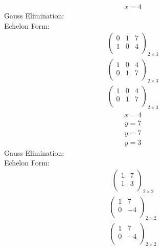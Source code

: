 \documentclass{article}
\begin{document}
\begin{align*}
x=4\end{align*}
Gauss Elimination:\\
Echelon Form:\\
\begin{align*}
\left(
\begin{array}{cc|c}
0 & 1 & 7\\
1 & 0 & 4\\
\end{array}
\right)_{2\times 3}
\end{align*}
\begin{align*}
\left(
\begin{array}{cc|c}
1 & 0 & 4\\
0 & 1 & 7\\
\end{array}
\right)_{2\times 3}
\end{align*}
\begin{align*}
\left(
\begin{array}{cc|c}
1 & 0 & 4\\
0 & 1 & 7\\
\end{array}
\right)_{2\times 3}
\end{align*}
\begin{align*}
x=4\end{align*}
\begin{align*}
y=7\end{align*}
\begin{align*}
y=7\end{align*}
\begin{align*}
y=3\end{align*}
Gauss Elimination:\\
Echelon Form:\\
\begin{align*}
\left(
\begin{array}{c|c}
1 & 7\\
1 & 3\\
\end{array}
\right)_{2\times 2}
\end{align*}
\begin{align*}
\left(
\begin{array}{c|c}
1 & 7\\
0 & -4\\
\end{array}
\right)_{2\times 2}
\end{align*}
\begin{align*}
\left(
\begin{array}{c|c}
1 & 7\\
0 & -4\\
\end{array}
\right)_{2\times 2}
\end{align*}
\end{document}
